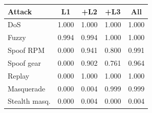 \begin{tabular}{@{}lcccc@{}}
\toprule
Attack & L1 & +L2 & +L3 & All\\
\midrule
DoS & 1.000 & 1.000 & 1.000 & 1.000\\
Fuzzy & 0.994 & 0.994 & 1.000 & 1.000\\
Spoof RPM & 0.000 & 0.941 & 0.800 & 0.991\\
Spoof gear & 0.000 & 0.902 & 0.761 & 0.964\\
Replay & 0.000 & 1.000 & 1.000 & 1.000\\
Masquerade & 0.000 & 0.004 & 0.999 & 0.999\\
Stealth masq. & 0.000 & 0.004 & 0.000 & 0.004\\
\bottomrule
\end{tabular}
